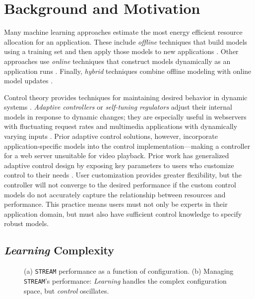 \section{Background and Motivation}
\label{sec:example}
Many machine learning approaches estimate the most energy efficient
resource allocation for an application.  These include \emph{offline}
techniques that build models using a training set and then apply those
models to new applications
\cite{Yi2003,LeeBrooks2006,CPR,ChenJohn2011,reddiHPCA2013,Paragon,PUPiL,quasar}.
Other approaches use \emph{online} techniques that construct models
dynamically as an application runs
\cite{Li2006,Flicker,ParallelismDial,Ponamarev,LeeBrooks}.  Finally,
\emph{hybrid} techniques combine offline modeling with online model
updates \cite{Zhang2012,packandcap,Winter2010,dubach2010,Koala,Cinder,
  wu2012inferred,LEO}.

Control theory provides techniques for maintaining desired behavior in
dynamic systems \cite{Hellerstein2004a}. \emph{Adaptive controllers}
or \emph{self-tuning regulators} adjust their internal models in
response to dynamic changes; they are especially useful in webservers
with fluctuating request rates
\cite{Horvarth,LuEtAl-2006a,SunDaiPan-2008a} and multimedia
applications with dynamically varying inputs
\cite{TCST,Agilos,grace2}.  Prior adaptive control solutions, however,
incorporate application-specific models into the control
implementation---making a controller for a web server unsuitable for
video playback.  Prior work has generalized adaptive control design by
exposing key parameters to users who customize control to their needs
\cite{ControlWare,POET}.  User customization provides greater
flexibility, but the controller will not converge to the desired
performance if the custom control models do not accurately capture the
relationship between resources and performance.  This practice means
users must not only be experts in their application domain, but must
also have sufficient control knowledge to specify robust models.

\subsection{\emph{Learning} Complexity}
\begin{figure}
\centering
  \subfloat[]
  {
    
    \label{fig:STREAM_timeline}
  }
  \caption{(a) \texttt{STREAM} performance as a function of
    configuration.  (b) Managing \texttt{STREAM}'s performance:
    \emph{Learning} handles the complex configuration space, but
    \emph{control} oscillates.}
  \label{fig:learning-models1}
\end{figure}

